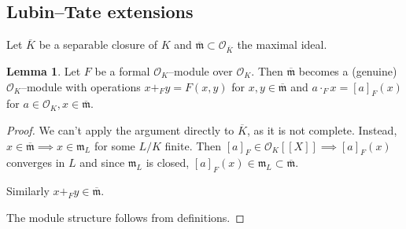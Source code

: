 \documentclass{article}
\theoremstyle{definition}
\newtheorem{lemma}[theorem]{Lemma}
\begin{document}
\subsection{Lubin--Tate extensions}
Let $\overline{K}$ be a separable closure of $K$ and $\overline{\mathfrak{m}} \subset \mathcal{O}_{\overline{K}}$ the maximal ideal.
\begin{lemma}
    Let $F$ be a formal $\mathcal{O}_K$--module over $\mathcal{O}_K$. Then $\overline{\mathfrak{m}}$ becomes a (genuine) $\mathcal{O}_K$--module with operations $x+_F y = F(x,y)$ for $x,y \in \overline{\mathfrak{m}}$ and $a \cdot _F x = [a]_F(x)$ for $a \in \mathcal{O}_K, x \in \overline{\mathfrak{m}}$. 
\end{lemma}
\begin{proof}
    We can't apply the argument directly to $\overline{K}$, as it is not complete. Instead, $x \in \overline{\mathfrak{m}} \implies x \in \mathfrak{m}_L$ for some $L/K$ finite. Then $[a]_F \in \mathcal{O}_K[[X]] \implies [a]_F(x)$ converges in $L$ and since $\mathfrak{m}_L$ is closed, $[a]_F(x) \in \mathfrak{m}_L \subset \overline{\mathfrak{m}}$. 
    \vspace{1mm}
     
    Similarly $x +_F y  \in \overline{\mathfrak{m}}$.
    \vspace{1mm}
     
    The module structure follows from definitions.
\end{proof}
\end{document}
